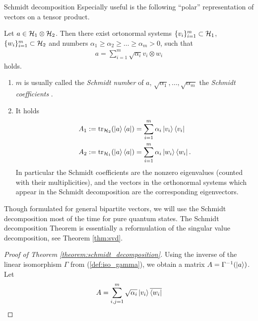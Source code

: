 	\begin{subsection}{Schmidt decomposition}
    Especially useful is the following ``polar'' representation of vectors on a tensor product. 
   \begin{theorem}\label{theorem:schmidt_decomposition} 
    Let $a \in {\mathcal H}_1 \otimes {\mathcal H}_2$. Then there exist ortonormal systems $\{v_i\}_{i=1}^m \subset {\mathcal H}_1$, $\{w_i\}_{i=1}^m \subset {\mathcal H}_2$ and numbers 
    $\alpha_1 \geq \alpha_2 \geq \dots \geq \alpha_m > 0$, such that 
    \begin{align*}
     a = \sum_{i=1}^m \sqrt{\alpha_i} v_i \otimes w_i \label{theorem:schmidt_decomposition_1}
    \end{align*}
    holds. 
   \end{theorem}
   \begin{remark}
    \begin{enumerate}
     \item $m$ is usually called the \emph{Schmidt number} of $a$, $\sqrt{\alpha_1}, \dots, \sqrt{\alpha_m}$ the \emph{Schmidt coefficients}
     .
     \item It holds 
     \begin{align*}
      A_1 := \mathrm{tr}_{{\mathcal H}_2}(\ket{a}\bra{a}) &= \sum_{i=1}^{m} \alpha_i \ket{v_i}\bra{v_i} \\
      A_2 := \mathrm{tr}_{{\mathcal H}_1}(\ket{a}\bra{a}) &= \sum_{i=1}^{m} \alpha_i \ket{w_i}\bra{w_i}. 
     \end{align*}
      In particular the Schmidt coefficients are the nonzero eigenvalues (counted with their multiplicities), and the vectors in the orthonormal systems which appear in 
      the Schmidt decomposition are the corresponding eigenvectors.
    \end{enumerate}
	\end{remark}
    Though formulated for general bipartite vectors, we will use the Schmidt decomposition most of the time for pure quantum states. 
    The Schmidt decomposition Theorem is essentially a reformulation of the singular value decomposition, see Theorem \ref{thm:svd}. 
    \begin{proof}[Proof of Theorem \ref{theorem:schmidt_decomposition}]
	 Using the inverse of the linear isomorphism $\Gamma$ from (\ref{def:iso_gamma}), we
	 obtain a matrix $A = \Gamma^{-1}(\ket{a})$. Let
	 \begin{align*}
	 A = \sum_{i,j=1}^{m} \sqrt{\alpha_i} \ket{v_i}\overline{\bra{w_i}}
	 \end{align*}

\end{proof}
\end{subsection}

